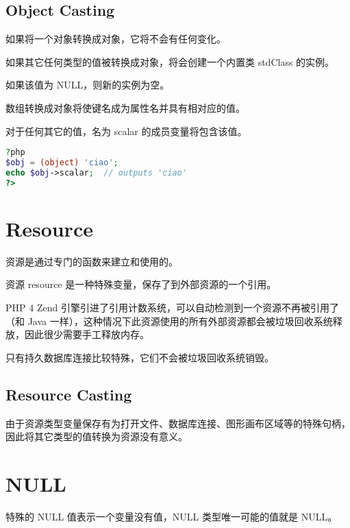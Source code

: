 \subsection{Object Casting}

\begin{compactitem}
\item 如果将一个对象转换成对象，它将不会有任何变化。
\item 如果其它任何类型的值被转换成对象，将会创建一个内置类 stdClass 的实例。
\item 如果该值为 NULL，则新的实例为空。
\item 数组转换成对象将使键名成为属性名并具有相对应的值。
\end{compactitem}


对于任何其它的值，名为 scalar 的成员变量将包含该值。


\begin{lstlisting}[language=PHP]
?php
$obj = (object) 'ciao';
echo $obj->scalar;  // outputs 'ciao'
?>
\end{lstlisting}



\section{Resource}

资源是通过专门的函数来建立和使用的。

资源 resource 是一种特殊变量，保存了到外部资源的一个引用。

PHP 4 Zend 引擎引进了引用计数系统，可以自动检测到一个资源不再被引用了（和 Java 一样），这种情况下此资源使用的所有外部资源都会被垃圾回收系统释放，因此很少需要手工释放内存。

只有持久数据库连接比较特殊，它们不会被垃圾回收系统销毁。


\subsection{Resource Casting}

由于资源类型变量保存有为打开文件、数据库连接、图形画布区域等的特殊句柄，因此将其它类型的值转换为资源没有意义。




\section{NULL}

特殊的 NULL 值表示一个变量没有值，NULL 类型唯一可能的值就是 NULL。

